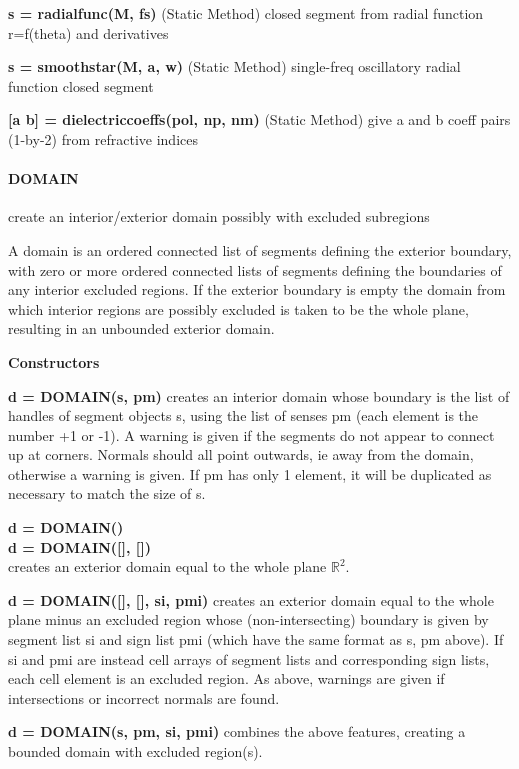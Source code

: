\textbf{s = radialfunc(M, fs)} (Static Method) closed segment from
radial function r=f(theta) and derivatives

\textbf{s = smoothstar(M, a, w)} (Static Method) single-freq
oscillatory radial function closed segment

\textbf{[a b] = dielectriccoeffs(pol, np, nm)} (Static Method) give a
and b coeff pairs (1-by-2) from refractive indices


 
\newpage

\paragraph{DOMAIN} create an interior/exterior domain possibly with
excluded subregions

A domain is an ordered connected list of segments defining the exterior
boundary, with zero or more ordered connected lists of segments defining the
boundaries of any interior excluded regions. If the exterior boundary is empty
the domain from which interior regions are possibly excluded is taken to be
the whole plane, resulting in an unbounded exterior domain.

\textbf{Constructors}

\textbf{d = DOMAIN(s, pm)} creates an interior domain whose boundary is the list
of handles of segment objects s, using the list of senses pm (each element
is the number +1 or -1). A warning is given if the segments do not appear
to connect up at corners. Normals should all point outwards, ie away from
the domain, otherwise a warning is given. If pm has only 1 element, it will
be duplicated as necessary to match the size of s.

\textbf{d = DOMAIN()}\\
\textbf{d = DOMAIN([], [])}\\
creates an exterior domain equal to the
whole plane $\mathbb{R}^2$.

\textbf{d = DOMAIN([], [], si, pmi)} creates an exterior domain equal to the whole
plane minus an excluded region whose (non-intersecting) boundary is given
by segment list si and sign list pmi (which have the same format as s, pm
above). If si and pmi are instead cell arrays of segment lists and
corresponding sign lists, each cell element is an excluded region. As
above, warnings are given if intersections or incorrect normals are found.

\textbf{d = DOMAIN(s, pm, si, pmi)} combines the above features, creating a bounded
domain with excluded region(s).


